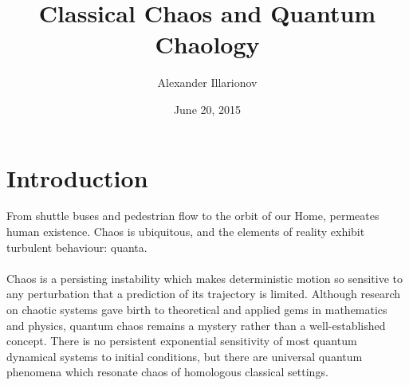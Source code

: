
\usepackage{float}
\graphicspath{ {images/} }
%

%


\title{Classical Chaos and Quantum Chaology}
\author{Alexander Illarionov}
\date{June 20, 2015}
\maketitle
%
\section*{Introduction}
\par From shuttle buses and pedestrian flow\cite{shuttle} to the orbit of our Home\cite{nbody},  permeates human existence. Chaos is ubiquitous, and the  elements of reality exhibit turbulent behaviour: quanta.\\\\
Chaos is a persisting instability which makes deterministic motion so sensitive to any perturbation that a prediction of its trajectory is limited.\cite{berry358} Although research on chaotic systems gave birth to theoretical and applied gems in mathematics and physics, quantum chaos remains a mystery rather than a well-established concept. There is no persistent exponential sensitivity of most\cite{berry230} quantum dynamical systems to initial conditions, but there are universal quantum phenomena which resonate chaos of homologous classical settings.\cite{berry191}\\\\
